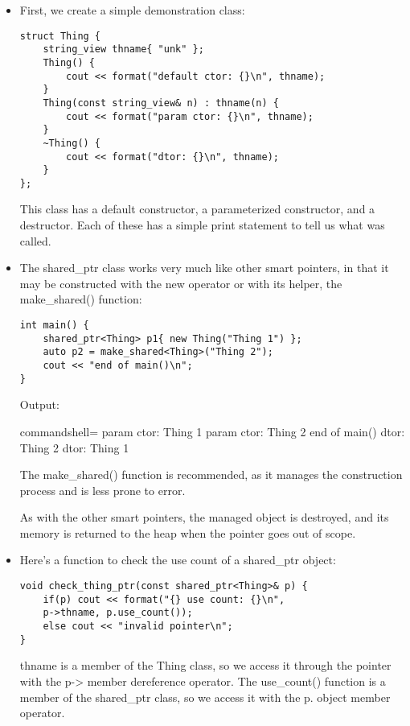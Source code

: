 \begin{itemize}
\item 
First, we create a simple demonstration class:

\begin{lstlisting}[style=styleCXX]
struct Thing {
	string_view thname{ "unk" };
	Thing() {
		cout << format("default ctor: {}\n", thname);
	}
	Thing(const string_view& n) : thname(n) {
		cout << format("param ctor: {}\n", thname);
	}
	~Thing() {
		cout << format("dtor: {}\n", thname);
	}
};
\end{lstlisting}

This class has a default constructor, a parameterized constructor, and a destructor. Each of these has a simple print statement to tell us what was called.

\item 
The shared\_ptr class works very much like other smart pointers, in that it may be constructed with the new operator or with its helper, the make\_shared() function:

\begin{lstlisting}[style=styleCXX]
int main() {
	shared_ptr<Thing> p1{ new Thing("Thing 1") };
	auto p2 = make_shared<Thing>("Thing 2");
	cout << "end of main()\n";
}
\end{lstlisting}

Output:

\begin{tcblisting}{commandshell={}}
param ctor: Thing 1
param ctor: Thing 2
end of main()
dtor: Thing 2
dtor: Thing 1
\end{tcblisting}

The make\_shared() function is recommended, as it manages the construction process and is less prone to error.

As with the other smart pointers, the managed object is destroyed, and its memory is returned to the heap when the pointer goes out of scope.

\item 
Here's a function to check the use count of a shared\_ptr object:

\begin{lstlisting}[style=styleCXX]
void check_thing_ptr(const shared_ptr<Thing>& p) {
	if(p) cout << format("{} use count: {}\n",
	p->thname, p.use_count());
	else cout << "invalid pointer\n";
}
\end{lstlisting}

thname is a member of the Thing class, so we access it through the pointer with the p-> member dereference operator. The use\_count() function is a member of the shared\_ptr class, so we access it with the p. object member operator.


\end{itemize}
